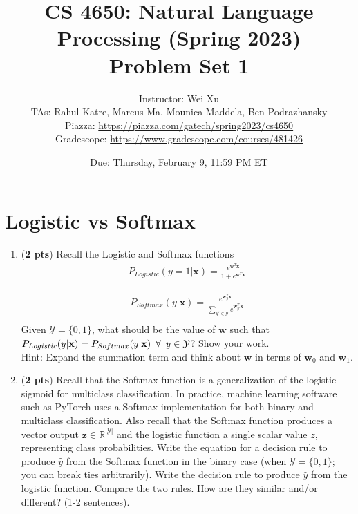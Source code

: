 \documentclass[11pt, letterpaper]{article}
\begin{document}
\title{CS 4650: Natural Language Processing (Spring 2023) \\ Problem Set 1}
\author{Instructor: Wei Xu \\ TAs: Rahul Katre, Marcus Ma, Mounica Maddela, Ben Podrazhansky
\\Piazza: \url{https://piazza.com/gatech/spring2023/cs4650}
\\Gradescope: \url{https://www.gradescope.com/courses/481426}}
\date{Due: Thursday, February 9, 11:59 PM ET}
\maketitle

    \section{Logistic vs Softmax}

    \begin{enumerate}
        \item (\textbf{2 pts}) Recall the Logistic and Softmax functions
    \begin{align*}
        P_{Logistic}(y=1|\mathbf{x}) = \frac{e^{\mathbf{w}^T\mathbf{x}}}{1 + e^{\mathbf{w}^T\mathbf{x}}}
    \end{align*}
    
    \begin{align*}
        P_{Softmax}(y|\mathbf{x}) = \frac{e^{\mathbf{w}_y^T\mathbf{x}}}{\sum_{y' \in \mathcal{Y}} e^{\mathbf{w}_{y'}^T\mathbf{x}}} \\
    \end{align*}
    Given $\mathcal{Y} = \{0,1\}$, what should be the value of $\mathbf{w}$ such that \\ $P_{Logistic}(y|\textbf{x}) = P_{Softmax}(y|\textbf{x}) \hspace{0.5em} \forall \hspace{0.5em} y \in \mathcal{Y}$? Show your work. \\
    Hint: Expand the summation term and think about $\mathbf{w}$ in terms of $\mathbf{w}_0$ and $\mathbf{w}_1$.
    
    \item (\textbf{2 pts}) Recall that the Softmax function is a generalization of the logistic sigmoid for multiclass classification. In practice, machine learning software such as PyTorch uses a Softmax implementation for both binary and multiclass classification. Also recall that the Softmax function produces a vector output $\mathbf{z} \in \mathbb{R}^{|\mathcal{Y}|}$ and the logistic function a single scalar value $z$, representing class probabilities. Write the equation for a decision rule to produce $\hat{y}$ from the Softmax function in the binary case (when $\mathcal{Y} = \{0,1\}$; you can break ties arbitrarily).
    Write the decision rule to produce $\hat{y}$ from the logistic function. Compare the two rules. How are they similar and/or different? (1-2 sentences).
    \end{enumerate}
\end{document}
